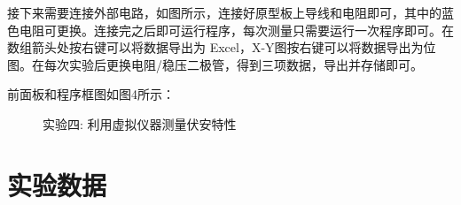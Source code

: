 \documentclass[11pt]{article}
\begin{document}
\begin{enumerate}
接下来需要连接外部电路，如图所示，连接好原型板上导线和电阻即可，其中的蓝色电阻可更换。连接完之后即可运行程序，每次测量只需要运行一次程序即可。在数组箭头处按右键可以将数据导出为 Excel，X-Y图按右键可以将数据导出为位图。在每次实验后更换电阻/稳压二极管，得到三项数据，导出并存储即可。
  
前面板和程序框图如图4所示：
  
\begin{figure}[H]
    \centering
    \caption{实验四: 利用虚拟仪器测量伏安特性}
\end{figure}

\end{enumerate}

\section{实验数据}
\end{document}
